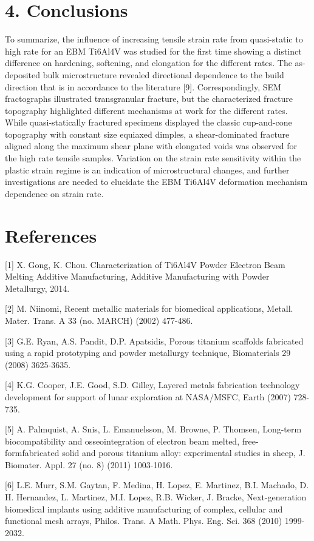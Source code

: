 \documentclass[10pt]{article}
\begin{document}
\section*{4. Conclusions}
To summarize, the influence of increasing tensile strain rate from quasi-static to high rate for an EBM Ti6Al4V was studied for the first time showing a distinct difference on hardening, softening, and elongation for the different rates. The as-deposited bulk microstructure revealed directional dependence to the build direction that is in accordance to the literature [9]. Correspondingly, SEM fractographs illustrated transgranular fracture, but the characterized fracture topography highlighted different mechanisms at work for the different rates. While quasi-statically fractured specimens displayed the classic cup-and-cone topography with constant size equiaxed dimples, a shear-dominated fracture aligned along the maximum shear plane with elongated voids was observed for the high rate tensile samples. Variation on the strain rate sensitivity within the plastic strain regime is an indication of microstructural changes, and further investigations are needed to elucidate the EBM Ti6Al4V deformation mechanism dependence on strain rate.

\section*{References}
[1] X. Gong, K. Chou. Characterization of Ti6Al4V Powder Electron Beam Melting Additive Manufacturing, Additive Manufacturing with Powder Metallurgy, 2014.

[2] M. Niinomi, Recent metallic materials for biomedical applications, Metall. Mater. Trans. A 33 (no. MARCH) (2002) 477-486.

[3] G.E. Ryan, A.S. Pandit, D.P. Apatsidis, Porous titanium scaffolds fabricated using a rapid prototyping and powder metallurgy technique, Biomaterials 29 (2008) 3625-3635.

[4] K.G. Cooper, J.E. Good, S.D. Gilley, Layered metals fabrication technology development for support of lunar exploration at NASA/MSFC, Earth (2007) 728-735.

[5] A. Palmquist, A. Snis, L. Emanuelsson, M. Browne, P. Thomsen, Long-term biocompatibility and osseointegration of electron beam melted, free-formfabricated solid and porous titanium alloy: experimental studies in sheep, J. Biomater. Appl. 27 (no. 8) (2011) 1003-1016.

[6] L.E. Murr, S.M. Gaytan, F. Medina, H. Lopez, E. Martinez, B.I. Machado, D. H. Hernandez, L. Martinez, M.I. Lopez, R.B. Wicker, J. Bracke, Next-generation biomedical implants using additive manufacturing of complex, cellular and functional mesh arrays, Philos. Trans. A Math. Phys. Eng. Sci. 368 (2010) 1999-2032.
\end{document}
